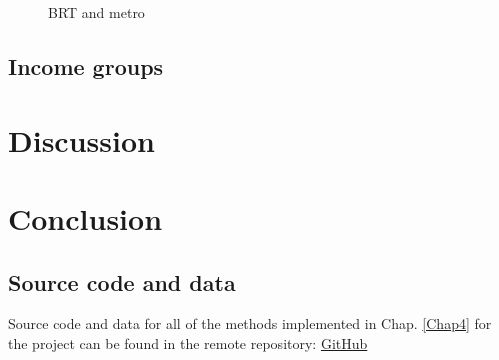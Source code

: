 \documentclass[12pt, a4paper]{report}
\begin{document}
\begin{figure}[H]
\begin{minipage}{0.45\textwidth}
         \caption{BRT and metro}
        \label{fig:Results_Opportunities}
    \end{minipage}    
\end{figure}





\section{Income groups}

\chapter{Discussion} \label{Chap6}
\chapter{Conclusion} \label{Chap7}


\renewcommand{\bibname}{References}

%

\begin{appendices}
\chapter{Source code and data} \label{Source_Code}
Source code and data for all of the methods implemented in Chap. \ref{Chap4} for the project can be found in the remote repository: \href{https://github.com/rpoandres/MSc_USS_Dissertation}{GitHub}







\end{appendices}
\clearpage
\printglossaries

\end{document}
